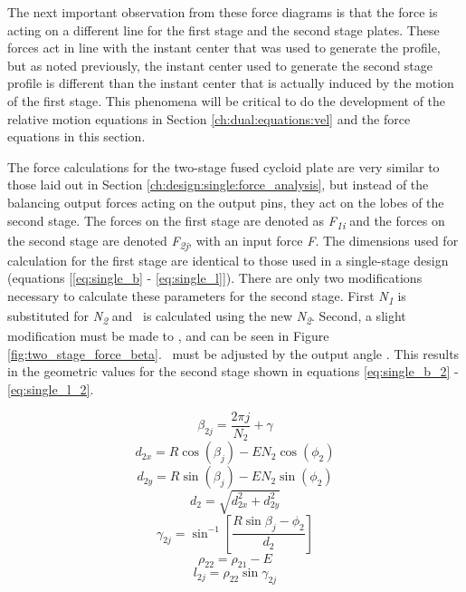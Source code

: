 The next important observation from these force diagrams is that the force is acting on a different line for the first stage and the second stage plates. These forces act in line with the instant center that was used to generate the profile, but as noted previously, the instant center used to generate the second stage profile is different than the instant center that is actually induced by the motion of the first stage. This phenomena will be critical to do the development of the relative motion equations in Section \ref{ch:dual:equations:vel} and the force equations in this section. 

The force calculations for the two-stage fused cycloid plate are very similar to those laid out in Section \ref{ch:design:single:force_analysis}, but instead of the balancing output forces acting on the output pins, they act on the lobes of the second stage. The forces on the first stage are denoted as \textit{F\textsubscript{1i}} and the forces on the second stage are denoted \textit{F\textsubscript{2j}}, with an input force \textit{F}. The dimensions used for calculation for the first stage are identical to those used in a single-stage design (equations [\ref{eq:single_b} - \ref{eq:single_l}]). There are only two modifications necessary to calculate these parameters for the second stage. First \textit{N\textsubscript{1}} is substituted for \textit{N\textsubscript{2}} and \textrho\ is calculated using the new \textit{N\textsubscript{2}}. Second, a slight modification must be made to \textbeta, and can be seen in Figure \ref{fig:two_stage_force_beta}. \textbeta\ must be adjusted by the output angle \textalpha. This results in the geometric values for the second stage shown in equations \ref{eq:single_b_2} - \ref{eq:single_l_2}.

\begin{equation} \label{eq:single_b_2}
\beta_{2j} = \frac{2\pi j}{N_2} + \gamma
\end{equation}
\begin{equation} \label{eq:single_d_x_2}
d_{2x} = R \cos(\beta_j) - E N_2 \cos(\phi_2)
\end{equation}
\begin{equation} \label{eq:single_d_y_2}
d_{2y} = R\sin(\beta_j) - E N_2 \sin(\phi_2)
\end{equation}
\begin{equation} \label{eq:single_d_2}
d_2 = \sqrt{d_{2x}^2 + d_{2y}^2}
\end{equation}
\begin{equation} \label{eq:single_gamma_2}
\gamma_{2j} = \sin^{-1}\left[{\frac{R \sin{\beta_j - \phi_2}}{d_2}}\right]
\end{equation}
\begin{equation} \label{eq:single_rho2_2}
\rho_{22} = \rho_{21} - E
\end{equation}
\begin{equation} \label{eq:single_l_2}
l_{2j} = \rho_{22} \sin{\gamma_{2j}}
\end{equation}


